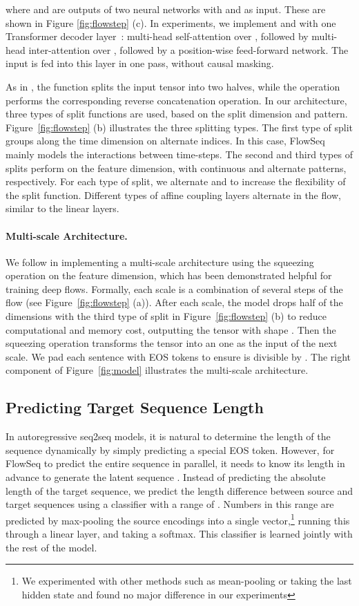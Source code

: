 \documentclass[11pt,a4paper]{article}
\begin{document}
where  and  are outputs of two neural networks with  and  as input.
These are shown in Figure \ref{fig:flowstep} (c).
In experiments, we implement  and  with one Transformer decoder layer~\citep{vaswani2017attention}: multi-head self-attention over , followed by multi-head inter-attention over , followed by a position-wise feed-forward network.
The input  is fed into this layer in one pass, without causal masking.

As in \citet{dinh2016density}, the  function splits  the input tensor into two halves, while the  operation performs the corresponding reverse concatenation operation.
In our architecture, three types of split functions are used, based on the split dimension and pattern.
Figure~\ref{fig:flowstep} (b) illustrates the three splitting types.
The first type of split groups  along the time dimension on alternate indices.
In this case, FlowSeq mainly models the interactions between time-steps.
The second and third types of splits perform on the feature dimension, with continuous and alternate patterns, respectively.
For each type of split, we alternate  and  to increase the flexibility of the split function.
Different types of affine coupling layers alternate in the flow, similar to the linear layers.

\paragraph{Multi-scale Architecture.}
We follow \citet{dinh2016density} in implementing a multi-scale architecture using the squeezing operation on the feature dimension, which has been demonstrated helpful for training deep flows. 
Formally, each scale is a combination of several steps of the flow (see Figure~\ref{fig:flowstep} (a)).
After each scale, the model drops half of the dimensions with the third type of split in Figure~\ref{fig:flowstep} (b) to reduce computational and memory cost, outputting the tensor with shape .
Then the squeezing operation transforms the  tensor into an  one as the input of the next scale. 
We pad each sentence with \textsf{EOS} tokens to ensure  is divisible by .
The right component of Figure~\ref{fig:model} illustrates the multi-scale architecture.

\subsection{Predicting Target Sequence Length}
\label{sec:len}
In autoregressive seq2seq models, it is natural to determine the length of the sequence dynamically by simply predicting a special \textsf{EOS} token.
However, for FlowSeq to predict the entire sequence in parallel, it needs to know its length in advance to generate the latent sequence . 
Instead of predicting the absolute length of the target sequence, we predict the length difference between source and target sequences using a classifier with a range of .
Numbers in this range are predicted by max-pooling the source encodings into a single vector,\footnote{We experimented with other methods such as mean-pooling or taking the last hidden state and found no major difference in our experiments}
running this through a linear layer, and taking a softmax.
This classifier is learned jointly with the rest of the model.
\end{document}
